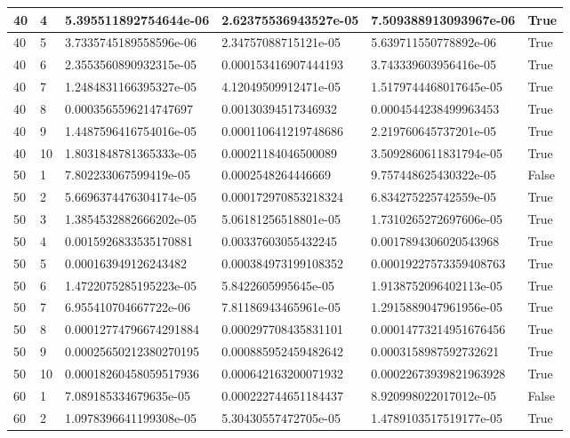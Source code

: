 \documentclass[a4paper, 12pt]{report}
\def\tabsize{4.4cm}
\def\stabsize{0.97cm}
\def\mtabsize{0.73cm}
\begin{document}
\begin{center}
\begin{longtable}{|m{\stabsize}|m{\stabsize}|m{\tabsize}|m{\tabsize}|m{\tabsize}|m{\mtabsize}|}
40 & 4 & 5.395511892754644e-06 & 2.62375536943527e-05 & 7.509388913093967e-06 & True \\ \hline  
40 & 5 & 3.7335745189558596e-06 & 2.34757088715121e-05 & 5.639711550778892e-06 & True \\ \hline  
40 & 6 & 2.3553560890932315e-05 & 0.000153416907444193 & 3.743339603956416e-05 & True \\ \hline  
40 & 7 & 1.2484831166395327e-05 & 4.12049509912471e-05 & 1.5179744468017645e-05 & True \\ \hline  
40 & 8 & 0.0003565596214747697 & 0.00130394517346932 & 0.0004544238499963453 & True \\ \hline  
40 & 9 & 1.4487596416754016e-05 & 0.000110641219748686 & 2.219760645737201e-05 & True \\ \hline  
40 & 10 & 1.8031848781365333e-05 & 0.00021184046500089 & 3.5092860611831794e-05 & True \\ \hline  
50 & 1 & 7.802233067599419e-05 & 0.0002548264446669 & 9.757448625430322e-05 & False \\ \hline  
50 & 2 & 5.6696374476304174e-05 & 0.000172970853218324 & 6.834275225742559e-05 & True \\ \hline  
50 & 3 & 1.3854532882666202e-05 & 5.06181256518801e-05 & 1.7310265272697606e-05 & True \\ \hline  
50 & 4 & 0.0015926833535170881 & 0.00337603055432245 & 0.0017894306020543968 & True \\ \hline  
50 & 5 & 0.000163949126243482 & 0.000384973199108352 & 0.00019227573359408763 & True \\ \hline  
50 & 6 & 1.4722075285195223e-05 & 5.8422605995645e-05 & 1.9138752096402113e-05 & True \\ \hline  
50 & 7 & 6.955410704667722e-06 & 7.81186943465961e-05 & 1.2915889047961956e-05 & True \\ \hline  
50 & 8 & 0.00012774796674291884 & 0.000297708435831101 & 0.00014773214951676456 & True \\ \hline  
50 & 9 & 0.00025650212380270195 & 0.000885952459482642 & 0.0003158987592732621 & True \\ \hline  
50 & 10 & 0.00018260458059517936 & 0.000642163200071932 & 0.00022673939821963928 & True \\ \hline  
60 & 1 & 7.089185334679635e-05 & 0.000222744651184437 & 8.920998022017012e-05 & False \\ \hline  
60 & 2 & 1.0978396641199308e-05 & 5.30430557472705e-05 & 1.4789103517519177e-05 & True \\ \hline  

\end{longtable}
\end{center}
\end{document}

